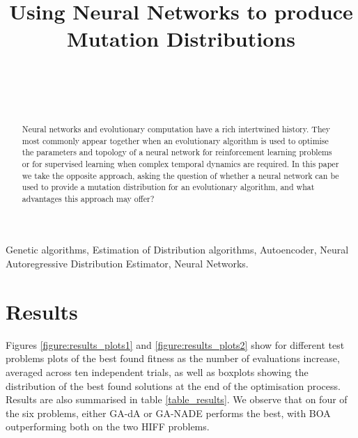 \documentclass[twoside]{article}
\begin{document}
\title{\bf Using Neural Networks to produce Mutation Distributions}  

\author{ \hfill {}\\ 
\AND
        \hfill {}\\
\AND
        \hfill {}\\
}

\maketitle

\begin{abstract}

Neural networks and evolutionary computation have a rich intertwined history. They most commonly appear together when an evolutionary algorithm is used to optimise the parameters and topology of a neural network for reinforcement learning problems or for supervised learning when complex temporal dynamics are required. In this paper we take the opposite approach, asking the question of whether a neural network can be used to provide a mutation distribution for an evolutionary algorithm, and what advantages this approach may offer? 

\end{abstract}

\begin{keywords}

Genetic algorithms, 
Estimation of Distribution algorithms,
Autoencoder,
Neural Autoregressive Distribution Estimator,
Neural Networks.

\end{keywords}
\section{Results}
Figures \ref{figure:results_plots1} and \ref{figure:results_plots2} show for different test problems plots of the best found fitness as the number of evaluations increase, averaged across ten independent trials, as well as boxplots showing the distribution of the best found solutions at the end of the optimisation process. Results are also summarised in table \ref{table_results}. We observe that on four of the six problems, either GA-dA or GA-NADE performs the best, with BOA outperforming both on the two HIFF problems.
\end{document}
